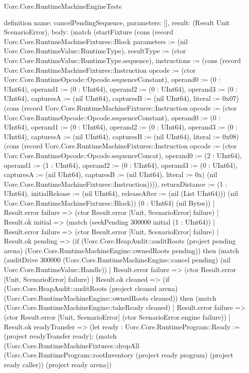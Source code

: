 \begin{lexlean}{Uorc.Core.RuntimeMachineEngineTests}
\begin{semanticmodule}
definition{
  name: cancelPendingSequence,
  parameters: [],
  result: (Result Unit ScenarioError),
  body: (match (startFixture (cons (record Uorc.Core.RuntimeMachineFixtures::Block {parameters := (nil Uorc.Core.RuntimeValue::RuntimeType), resultType := (ctor Uorc.Core.RuntimeValue::RuntimeType.sequence), instructions := (cons (record Uorc.Core.RuntimeMachineFixtures::Instruction {opcode := (ctor Uorc.Core.RuntimeOpcode::Opcode.sequenceConstant), operand0 := (0 : UInt64), operand1 := (0 : UInt64), operand2 := (0 : UInt64), operand3 := (0 : UInt64), capturesA := (nil UInt64), capturesB := (nil UInt64), literal := 0x07}) (cons (record Uorc.Core.RuntimeMachineFixtures::Instruction {opcode := (ctor Uorc.Core.RuntimeOpcode::Opcode.sequenceConstant), operand0 := (0 : UInt64), operand1 := (0 : UInt64), operand2 := (0 : UInt64), operand3 := (0 : UInt64), capturesA := (nil UInt64), capturesB := (nil UInt64), literal := 0x08}) (cons (record Uorc.Core.RuntimeMachineFixtures::Instruction {opcode := (ctor Uorc.Core.RuntimeOpcode::Opcode.sequenceConcat), operand0 := (2 : UInt64), operand1 := (1 : UInt64), operand2 := (0 : UInt64), operand3 := (0 : UInt64), capturesA := (nil UInt64), capturesB := (nil UInt64), literal := 0x}) (nil Uorc.Core.RuntimeMachineFixtures::Instruction)))), returnDistance := (1 : UInt64), initialRelease := (nil UInt64), releaseAfter := (nil (List UInt64))}) (nil Uorc.Core.RuntimeMachineFixtures::Block)) (0 : UInt64) (nil Bytes))
    | Result.error failure => (ctor Result.error [Unit, ScenarioError] failure)
    | Result.ok initial => (match (seekPending 300000 initial (1 : UInt64))
      | Result.error failure => (ctor Result.error [Unit, ScenarioError] failure)
      | Result.ok pending => (if (Uorc.Core.HeapAudit::auditRoots (project pending arena) (Uorc.Core.RuntimeMachineEngine::ownedRoots pending)) then (match (auditDrive 300000 (Uorc.Core.RuntimeMachineEngine::cancel pending) (nil Uorc.Core.RuntimeValue::Handle))
        | Result.error failure => (ctor Result.error [Unit, ScenarioError] failure)
        | Result.ok cleaned => (if (Uorc.Core.HeapAudit::auditRoots (project cleaned arena) (Uorc.Core.RuntimeMachineEngine::ownedRoots cleaned)) then (match (Uorc.Core.RuntimeMachineEngine::takeReady cleaned)
          | Result.error failure => (ctor Result.error [Unit, ScenarioError] (ctor ScenarioError.engine failure))
          | Result.ok readyTransfer => (let ready : Uorc.Core.RuntimeProgram::Ready := (project readyTransfer ready); (match (Uorc.Core.RuntimeMachineFixtures::dropAll (Uorc.Core.RuntimeProgram::rootInventory (project ready program) (project ready caller)) (project ready arena))
}
\end{semanticmodule}
\end{lexlean}
